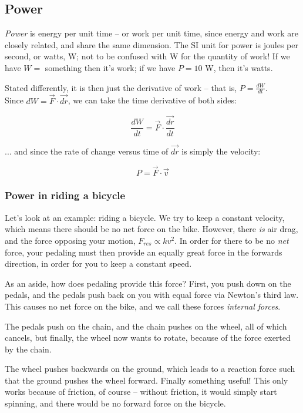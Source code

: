 \subsection{Power}

\emph{Power} is energy per unit time -- or work per unit time, since energy and work are closely related, and share the same dimension. The SI unit for power is joules per second, or watts, W; not to be confused with W for the quantity of work! If we have $W = $ something then it's work; if we have $P = 10$ W, then it's watts.

Stated differently, it is then just the derivative of work -- that is, $P = \displaystyle \frac{dW}{dt}$.\\
Since $dW = \vec{F} \cdot \vec{dr}$, we can take the time derivative of both sides:

\begin{equation}
\frac{dW}{dt} = \vec{F} \cdot \frac{\vec{dr}}{dt}
\end{equation}

... and since the rate of change versus time of $\vec{dr}$ is simply the velocity:

\begin{equation}
P = \vec{F} \cdot \vec{v}
\end{equation}

\subsubsection{Power in riding a bicycle}

Let's look at an example: riding a bicycle. We try to keep a constant velocity, which means there should be no net force on the bike. However, there \emph{is} air drag, and the force opposing your motion, $F_{res} \propto k v^2$. In order for there to be no \emph{net} force, your pedaling must then provide an equally great force in the forwards direction, in order for you to keep a constant speed.

As an aside, how does pedaling provide this force? First, you push down on the pedals, and the pedals push back on you with equal force via Newton's third law. This causes no net force on the bike, and we call these forces \emph{internal forces}.

The pedals push on the chain, and the chain pushes on the wheel, all of which cancels, but finally, the wheel now wants to rotate, because of the force exerted by the chain.

The wheel pushes backwards on the ground, which leads to a reaction force such that the ground pushes the wheel forward. Finally something useful! This only works because of friction, of course -- without friction, it would simply start spinning, and there would be no forward force on the bicycle.

